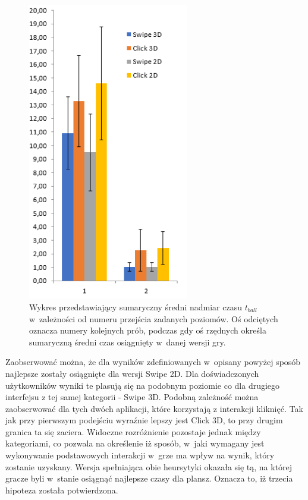 \documentclass[a4paper,12pt,numbers=noenddot]{report}
\begin{document}
\begin{figure}[h!]
	\centering
  	\includegraphics[width=7cm]{diag/tBall_sum.png}
	\caption{Wykres przedstawiający sumaryczny średni nadmiar czasu $t_{ball}$ w~zależności od numeru przejścia zadanych poziomów. Oś odciętych oznacza numery kolejnych prób, podczas gdy oś rzędnych określa sumaryczną średni czas osiągnięty w~danej wersji gry.}
	\label{fig:diag_tball_sum}
\end{figure}

Zaobserwować można, że dla wyników zdefiniowanych w~opisany powyżej sposób najlepsze zostały osiągnięte dla wersji Swipe 2D. Dla doświadczonych użytkowników wyniki te plasują się na podobnym poziomie co dla drugiego interfejsu z tej samej kategorii - Swipe 3D. Podobną zależność można zaobserwować dla tych dwóch aplikacji, które korzystają z interakcji kliknięć. Tak jak przy pierwszym podejściu wyraźnie lepszy jest Click 3D, to przy drugim granica ta się zaciera. Widoczne rozróżnienie pozostaje jednak między kategoriami, co pozwala na określenie iż sposób, w~jaki wymagany jest wykonywanie podstawowych interakcji w~grze ma wpływ na wynik, który zostanie uzyskany. Wersja spełniająca obie heursytyki okazała się tą, na której gracze byli w~stanie osiągnąć najlepsze czasy dla plansz. Oznacza to, iż trzecia hipoteza została potwierdzona.


\end{document}
